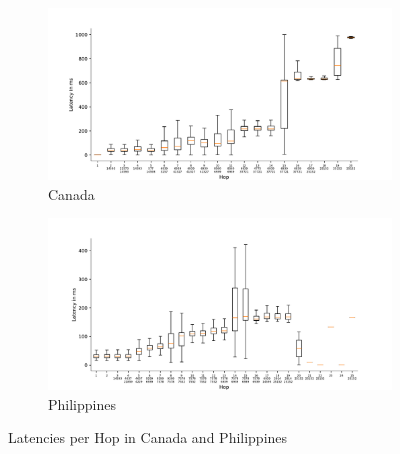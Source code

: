 \begin{figure}
	\centering
	\begin{subfigure}[b]{\linewidth}
		\includegraphics[width=\linewidth]{chapters/4-results/traceroute/img/latency-per-hop-CA-5001.pdf}
		\caption{Canada}
		\label{fig:latency-change-per-hop-1-ca}
	\end{subfigure}
	\begin{subfigure}[b]{\linewidth}
		\includegraphics[width=\linewidth]{chapters/4-results/traceroute/img/latency-per-hop-PH-5001.pdf}
		\caption{Philippines}
	\end{subfigure}
	\caption{Latencies per Hop in Canada and Philippines}
	\label{fig:latency-change-per-hop-1}
\end{figure}

